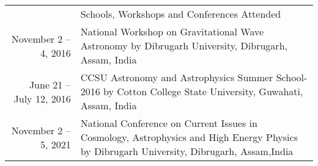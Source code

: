 \documentclass[a4paper, 11pt]{article}
\newcommand{\headingfont}{\Large\color{Bittersweet}}
\newenvironment{SectionTable}[1]{
	\renewcommand*{\arraystretch}{1.7}
	\setlength{\tabcolsep}{10pt}
	\begin{longtable}{Rp{5.2in}} & #1 \\}
{\end{longtable}\vspace{-.3cm}}
\begin{document}
\begin{SectionTable}{\headingfont Schools, Workshops and Conferences Attended}
November 2 -- 4, 2016 &
National Workshop on Gravitational Wave Astronomy by Dibrugarh University, Dibrugarh, Assam, India
\\

June 21 -- July 12, 2016 &
CCSU Astronomy and Astrophysics Summer School-2016 by Cotton College State University, Guwahati, Assam, India
\\

November 2 -- 5, 2021 &
National Conference on Current Issues in Cosmology, Astrophysics and High Energy Physics by Dibrugarh University, Dibrugarh, Assam,India
\\
\end{SectionTable}














\end{document}
